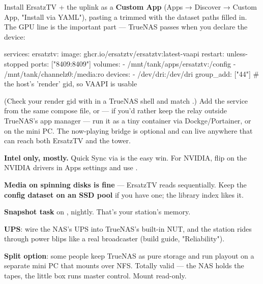 \documentclass[fontpath=fonts/,logopath=logo/]{riposte-doc}
\begin{document}

Install ErsatzTV + the uplink as a \textbf{Custom App} (Apps → Discover → Custom App, "Install via YAML"), pasting a trimmed  with the dataset paths filled in. The GPU line is the important part — TrueNAS passes  when you declare the device:

\ripcodeopen
{}
\begin{ripcodeblock}
services:
  ersatztv:
    image: ghcr.io/ersatztv/ersatztv:latest-vaapi
    restart: unless-stopped
    ports: ["8409:8409"]
    volumes:
      - /mnt/tank/apps/ersatztv:/config
      - /mnt/tank/channelz0:/media:ro
    devices:
      - /dev/dri:/dev/dri
    group_add: ["44"]        # the host's 'render' gid, so VAAPI is usable
\end{ripcodeblock}
\ripcodesizereset\ripcodeclose

(Check your render gid with  in a TrueNAS shell and match .) Add the  service from the same compose file, or — if you'd rather keep the relay outside TrueNAS's app manager — run it as a tiny container via Dockge/Portainer, or on the mini PC. The now-playing bridge is optional and can live anywhere that can reach both ErsatzTV and the tower.



\begin{ripbullets}
\item \textbf{Intel only, mostly.} Quick Sync via  is the easy win. For NVIDIA, flip on the NVIDIA drivers in Apps settings and use .
\item \textbf{Media on spinning disks is fine} — ErsatzTV reads sequentially. Keep the \textbf{config dataset on an SSD pool} if you have one; the library index likes it.
\item \textbf{Snapshot task} on , nightly. That's your station's memory.
\item \textbf{UPS}: wire the NAS's UPS into TrueNAS's built-in NUT, and the station rides through power blips like a real broadcaster (build guide, "Reliability").
\item \textbf{Split option}: some people keep TrueNAS as pure storage and run playout on a separate mini PC that mounts  over NFS. Totally valid — the NAS holds the tapes, the little box runs master control. Mount read-only.
\end{ripbullets}
\end{document}
